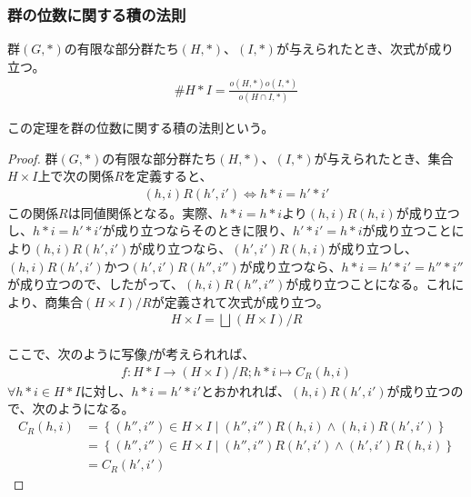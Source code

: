 \documentclass[dvipdfmx]{jsarticle}
\begin{document}
\subsubsection{群の位数に関する積の法則}%
\begin{thm}[群の位数に関する積の法則]\label{3.1.1.40}
群$(G,*)$の有限な部分群たち$(H,*)$、$(I,*)$が与えられたとき、次式が成り立つ。
\begin{align*}
\#{H*I} = \frac{o(H,*)o(I,*)}{o(H \cap I,*)}
\end{align*}\par
この定理を群の位数に関する積の法則という。
\end{thm}
\begin{proof}
群$(G,*)$の有限な部分群たち$(H,*)$、$(I,*)$が与えられたとき、集合$H \times I$上で次の関係$R$を定義すると、
\begin{align*}
(h,i)R\left( h',i' \right) \Leftrightarrow h*i = h'*i'
\end{align*}
この関係$R$は同値関係となる。実際、$h*i = h*i$より$(h,i)R(h,i)$が成り立つし、$h*i = h'*i'$が成り立つならそのときに限り、$h'*i' = h*i$が成り立つことにより$(h,i)R\left( h',i' \right)$が成り立つなら、$\left( h',i' \right)R(h,i)$が成り立つし、$(h,i)R\left( h',i' \right)$かつ$\left( h',i' \right)R\left( h'',i'' \right)$が成り立つなら、$h*i = h'*i' = h''*i''$が成り立つので、したがって、$(h,i)R\left( h'',i'' \right)$が成り立つことになる。これにより、商集合${(H \times I)}/{R}$が定義されて次式が成り立つ。
\begin{align*}
H \times I = \bigsqcup_{} {(H \times I)}/{R}
\end{align*}\par
ここで、次のように写像$f$が考えられれば、
\begin{align*}
f:H*I \rightarrow {(H \times I)}/{R};h*i \mapsto C_{R}(h,i)
\end{align*}
$\forall h*i \in H*I$に対し、$h*i = h'*i'$とおかれれば、$(h,i)R\left( h',i' \right)$が成り立つので、次のようになる。
\begin{align*}
C_{R}(h,i) &= \left\{ \left( h'',i'' \right) \in H \times I \middle| \left( h'',i'' \right)R(h,i) \land (h,i)R\left( h',i' \right) \right\}\\
&= \left\{ \left( h'',i'' \right) \in H \times I \middle| \left( h'',i'' \right)R\left( h',i' \right) \land \left( h',i' \right)R(h,i) \right\}\\
&= C_{R}\left( h',i' \right)
\end{align*}

\end{proof}
\end{document}
